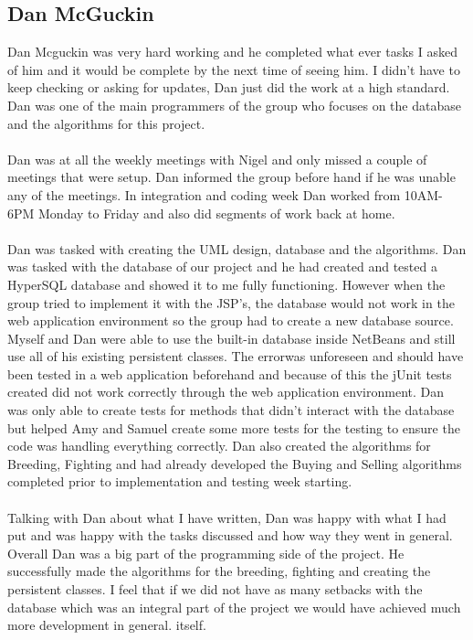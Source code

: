 \documentclass[titlepage]{article}
\begin{document}
{\subsection {Dan McGuckin}
Dan Mcguckin was very hard working and he completed what ever tasks I asked of him and it would be complete by 
the next time of seeing him. I didn't have to keep checking or asking for updates, Dan just did the work at a high standard. Dan was one of the main programmers of the group who focuses on the database and the algorithms for this project.
\\
\\
Dan was at all the weekly meetings with Nigel and only missed a couple of meetings that were setup. Dan informed the group before hand if he was unable any of the meetings. In integration and coding week Dan worked from 10AM-6PM Monday to Friday and also did segments of work back at home.
\\
\\
Dan was tasked with creating the UML design, database and the algorithms. Dan was 
tasked with the database of our project and he had created and tested a HyperSQL database and showed it to me fully functioning. However when the group tried to implement it with the JSP’s, the database would not work in the web application environment so the group had to create a new database source.  Myself and Dan were able to use the built-in database inside NetBeans and still use all of his existing persistent classes. The errorwas unforeseen and should have been tested in a web application beforehand and because of this the jUnit tests created did not work correctly through the web application environment. Dan was only able to create tests for methods that didn’t interact with the database but helped Amy and Samuel create some more tests for the testing to ensure the code was handling everything correctly. Dan also created the algorithms for Breeding,
Fighting and had already developed the Buying and Selling algorithms completed prior to implementation and testing week starting.
\\
\\
Talking with Dan about what I have written, Dan was happy with what I had put and was 
happy with the tasks discussed and how way they went in general. Overall Dan was a big part of the programming side of the project. He successfully made the algorithms for the breeding, fighting and creating the persistent classes. I feel that if we did not have as many setbacks with the database which was an integral part of the project we would have achieved much more development in general.
itself.
}
\end{document}
